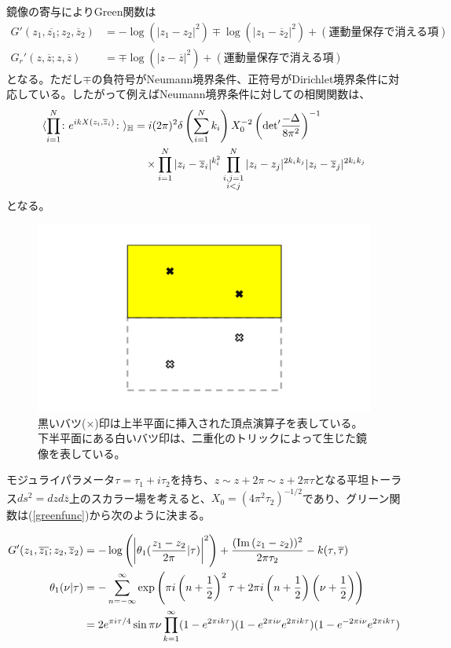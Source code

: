 鏡像の寄与によりGreen関数は
\begin{align}\label{scalarGreenUHP}
G'(z_1,\overline{z_1};z_2,\overline{z}_2)&=-\log (|z_1-z_2|^2)\mp\log(|z_1-\overline{z}_2|^2)+(\text{運動量保存で消える項})\\
G_r'(z,\overline{z};z,\overline{z})&=\mp\log(|z-\overline{z}|^2)+(\text{運動量保存で消える項})
\end{align}
となる。ただし$\mp$の負符号がNeumann境界条件、正符号がDirichlet境界条件に対応している。したがって例えばNeumann境界条件に対しての相関関数は、
\begin{align}
\langle \prod_{i=1}^{N} \colon e^{ikX(z_i,\overline{z}_i)}\colon  \rangle_{\mathbb{H}}&=i(2\pi)^2\delta\left(\sum_{i=1}^{N}k_i \right)X_0^{-2}\left(\text{det}' \frac{-\Delta}{8\pi^2} \right)^{-1}\notag\\
&\quad \times \prod_{i=1}^{N}|z_i-\overline{z}_i|^{k_i^2} \prod_{\substack{i,j=1\\i<j}}^{N}|z_i-z_j|^{2k_ik_j}|z_i-\overline{z}_j|^{2k_ik_j}
\end{align}
となる。
\begin{figure}[h]
	\centering
	\includegraphics[width=0.7\linewidth]{UHPCF.pdf}
	\caption{黒いバツ($\times$)印は上半平面に挿入された頂点演算子を表している。下半平面にある白いバツ印は、二重化のトリックによって生じた鏡像を表している。}
	\label{fig:uhpcf}
\end{figure}


モジュライパラメータ$\tau=\tau_1+i\tau_2$を持ち、$z\sim z+2\pi \sim z+2\pi\tau$となる平坦トーラス$ds^2=dzd\overline{z}$上のスカラー場を考えると、$X_0=(4\pi^2\tau_2)^{-1/2}$であり、グリーン関数は(\ref{greenfunc})から次のように決まる。

\begin{align}
G'(z_1,\overline{z_1};z_2,\overline{z}_2)&=-\log \left(\left|\theta_1(\frac{z_1-z_2}{2\pi}|\tau) \right|^2\right)+\frac{(\text{Im}\,(z_1-z_2) )^2}{2\pi\tau_2}-k(\tau,\overline{\tau})\\
\theta_1(\nu|\tau)&=-\sum_{n=-\infty}^{\infty}\exp\left(\pi i\left(n+\frac{1}{2}\right)^2\tau+2\pi i\left(n+\frac{1}{2}\right)\left(\nu+\frac{1}{2}\right)\right)\\
&=2e^{\pi i \tau/4}\sin\pi\nu \prod_{k=1}^{\infty}(1-e^{2\pi i k\tau})(1-e^{2\pi i\nu}e^{2\pi i k\tau})(1-e^{-2\pi i\nu}e^{2\pi i k\tau})
\end{align}


